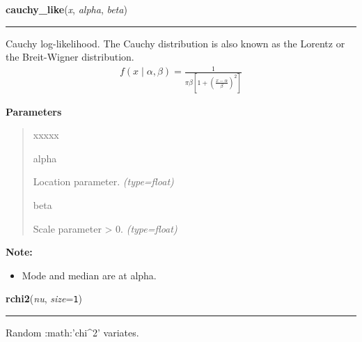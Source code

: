     \begin{boxedminipage}{\textwidth}

    \raggedright \textbf{cauchy\_like}(\textit{x}, \textit{alpha}, \textit{beta})

    \vspace{-1.5ex}

    \rule{\textwidth}{0.5\fboxrule}

Cauchy log-likelihood. The Cauchy distribution is also known as the
Lorentz or the Breit-Wigner distribution.
\begin{equation*}\begin{split}f(x \mid \alpha, \beta) = \frac{1}{\pi \beta [1 + (\frac{x-\alpha}{\beta})^2]}\end{split}\end{equation*}    \vspace{1ex}

      \textbf{Parameters}
      \begin{quote}
        \begin{Ventry}{xxxxx}

          \item[alpha]


Location parameter.
            \textit{(type=float)}

          \item[beta]


Scale parameter {\textgreater} 0.
            \textit{(type=float)}

        \end{Ventry}

      \end{quote}

    \vspace{1ex}

\textbf{Note:} \begin{itemize}
\item {} 
Mode and median are at alpha.

\end{itemize}


    \end{boxedminipage}

    \label{pymc:distributions:rchi2}

    \vspace{0.5ex}

    \begin{boxedminipage}{\textwidth}

    \raggedright \textbf{rchi2}(\textit{nu}, \textit{size}=\texttt{1})

    \vspace{-1.5ex}

    \rule{\textwidth}{0.5\fboxrule}

Random :math:'chi{\textasciicircum}2' variates.
    \vspace{1ex}

    \end{boxedminipage}

